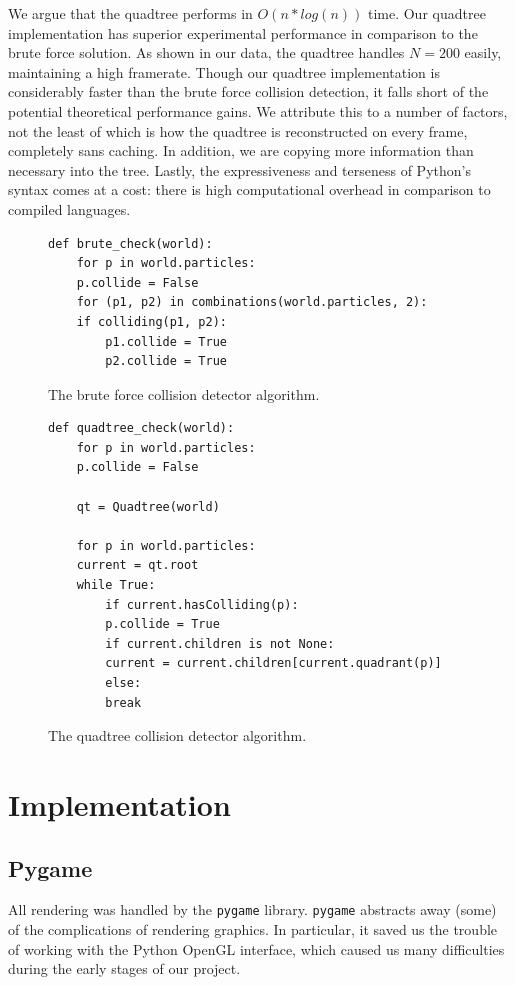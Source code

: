 	\par We argue that the quadtree performs in $O(n*log(n))$ time.
	Our quadtree implementation has superior experimental
	performance in comparison to the brute force solution. As shown
	in our data, the quadtree handles $N = 200$ easily, maintaining
	a high framerate.  Though our quadtree implementation is
	considerably faster than the brute force collision detection, it
	falls short of the potential theoretical performance gains. We
	attribute this to a number of factors, not the least of which is
	how the quadtree is reconstructed on every frame, completely
	sans caching. In addition, we are copying more information than
	necessary into the tree. Lastly, the expressiveness and
	terseness of Python’s syntax comes at a cost: there is high
	computational overhead in comparison to compiled languages.


    \begin{figure}[hb]
      \begin{verbatim}
def brute_check(world):
    for p in world.particles:
	p.collide = False
    for (p1, p2) in combinations(world.particles, 2):
	if colliding(p1, p2):
	    p1.collide = True
	    p2.collide = True
      \end{verbatim}
      \caption{The brute force collision detector algorithm.}
      \label{figure:brute}
    \end{figure}

    \begin{figure}
      \begin{verbatim}
def quadtree_check(world):
    for p in world.particles:
	p.collide = False

    qt = Quadtree(world)

    for p in world.particles:
	current = qt.root
	while True:
	    if current.hasColliding(p):
		p.collide = True
	    if current.children is not None:
		current = current.children[current.quadrant(p)]
	    else:
		break
      \end{verbatim}
      \caption{The quadtree collision detector algorithm.}
      \label{figure:quadtree}
    \end{figure}

    \section{Implementation}
      \subsection{Pygame}
	All rendering was handled by the \texttt{pygame} library.
	\texttt{pygame} abstracts away (some) of the complications of
	rendering graphics. In particular, it saved us the trouble of
	working with the Python OpenGL interface, which caused us many
	difficulties during the early stages of our project.

